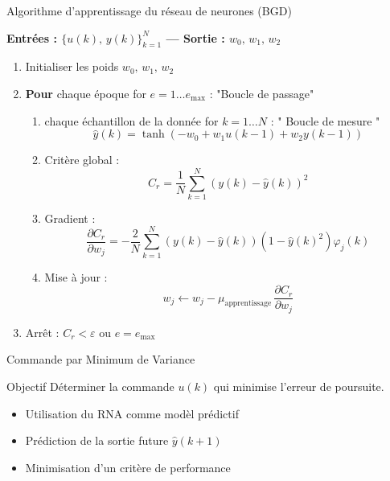 \documentclass[aspectratio=169,12pt]{beamer}
\begin{document}
	\begin{frame}{\color{red}Algorithme d'apprentissage du réseau de neurones (BGD)}
		\footnotesize
		
		\textbf{Entrées : $\{u(k),\, y(k)\}_{k=1}^{N}$ — Sortie : $w_0,\, w_1,\, w_2$}
		
		\begin{enumerate}\itemsep2pt
			\item Initialiser les poids $w_0,\, w_1,\, w_2$ 
			
			\item \textbf{Pour} chaque époque for $e = 1 \dots e_{\max}$ : {\color{green}"Boucle de passage"}
			\begin{enumerate}\itemsep1pt
				
				\item chaque échantillon de la donnée for $k =1 \dots N$ : {\color{green}" Boucle de mesure "}
				\[
				\hat{y}(k)=\tanh(-w_0+w_1u(k-1)+w_2y(k-1))
				\]
				
				\item Critère global :
				\[
				C_r=\frac{1}{N}\sum_{k=1}^{N}(y(k)-\hat{y}(k))^2
				\]
				
				\item Gradient :
				\[
				\frac{\partial C_r}{\partial w_j}
				=-\frac{2}{N}\sum_{k=1}^{N}(y(k)-\hat{y}(k))(1-\hat{y}(k)^2)\varphi_j(k)
				\]
				
				\item Mise à jour :
				\[
				w_j \leftarrow w_j - \mu_{\text{apprentissage}}\,\frac{\partial C_r}{\partial w_j}
				\]
				
			\end{enumerate}
			
			\item Arrêt : $C_r < \varepsilon$ ou $e = e_{\max}$
		\end{enumerate}
		
	\end{frame}
	\begin{frame}{\color{red}Commande par Minimum de Variance}
		
		\begin{alertblock}{Objectif}
			Déterminer la commande $u(k)$ qui minimise l’erreur de poursuite.
		\end{alertblock}
		
		\vspace{4pt}
		
		\begin{itemize}
			
			\item Utilisation du RNA comme modèl prédictif
			
			\item Prédiction de la sortie future $\hat{y}(k+1)$
			
			\item Minimisation d’un critère de performance
			
		\end{itemize}
		
		\vspace{6pt}
		
	\end{frame}
	
\end{document}

